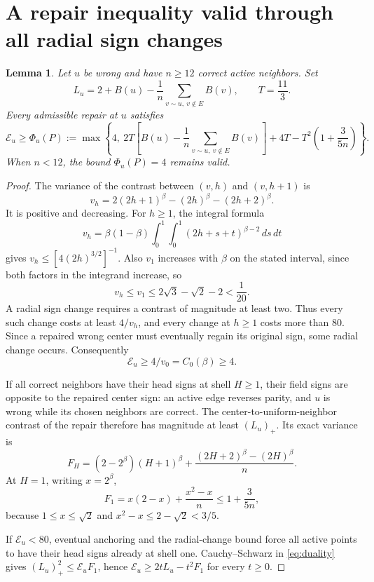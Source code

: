 \documentclass[11pt]{article}
\newtheorem{lemma}{Lemma}
\newcommand{\cost}{\mathcal E}
\begin{document}
\section{A repair inequality valid through all radial sign changes}
\begin{lemma}\label{lem:local}
Let $u$ be wrong and have $n\ge12$ correct active neighbors. Set
\[
 L_u=2+B(u)-\frac1n\sum_{v\sim u,\ v\notin E}B(v),\qquad T=\frac{11}{3}.
\]
Every admissible repair at $u$ satisfies
\begin{equation}\label{eq:loss}
 \cost_u\ge\Phi_u(P):=
 \max\left\{4,\ 2T\left[B(u)-\frac1n\sum_{v\sim u,\ v\notin E}B(v)\right]
       +4T-T^2\left(1+\frac3{5n}\right)\right\}.
\end{equation}
When $n<12$, the bound $\Phi_u(P)=4$ remains valid.
\end{lemma}
\begin{proof}
The variance of the contrast between $(v,h)$ and $(v,h+1)$ is
\[
 v_h=2(2h+1)^\beta-(2h)^\beta-(2h+2)^\beta.
\]
It is positive and decreasing. For $h\ge1$, the integral formula
\[
 v_h=\beta(1-\beta)\int_0^1\int_0^1(2h+s+t)^{\beta-2}\,ds\,dt
\]
gives $v_h\le[4(2h)^{3/2}]^{-1}$. Also $v_1$ increases with $\beta$ on the stated interval, since both factors in the integrand increase, so
\[
 v_h\le v_1\le2\sqrt3-\sqrt2-2<\frac1{20}.
\]
A radial sign change requires a contrast of magnitude at least two. Thus every such change costs at least $4/v_h$, and every change at $h\ge1$ costs more than $80$. Since a repaired wrong center must eventually regain its original sign, some radial change occurs. Consequently
\begin{equation}\label{eq:baseline}
 \cost_u\ge4/v_0=C_0(\beta)\ge4.
\end{equation}

If all correct neighbors have their head signs at shell $H\ge1$, their field signs are opposite to the repaired center sign: an active edge reverses parity, and $u$ is wrong while its chosen neighbors are correct. The center-to-uniform-neighbor contrast of the repair therefore has magnitude at least $(L_u)_+$. Its exact variance is
\[
 F_H=(2-2^\beta)(H+1)^\beta+\frac{(2H+2)^\beta-(2H)^\beta}{n}.
\]
At $H=1$, writing $x=2^\beta$,
\[
 F_1=x(2-x)+\frac{x^2-x}{n}\le1+\frac3{5n},
\]
because $1\le x\le\sqrt2$ and $x^2-x\le2-\sqrt2<3/5$.

If $\cost_u<80$, eventual anchoring and the radial-change bound force all active points to have their head signs already at shell one. Cauchy--Schwarz in \eqref{eq:duality} gives $(L_u)_+^2\le\cost_uF_1$, hence
$\cost_u\ge2tL_u-t^2F_1$ for every $t\ge0$.


\end{proof}
\end{document}
